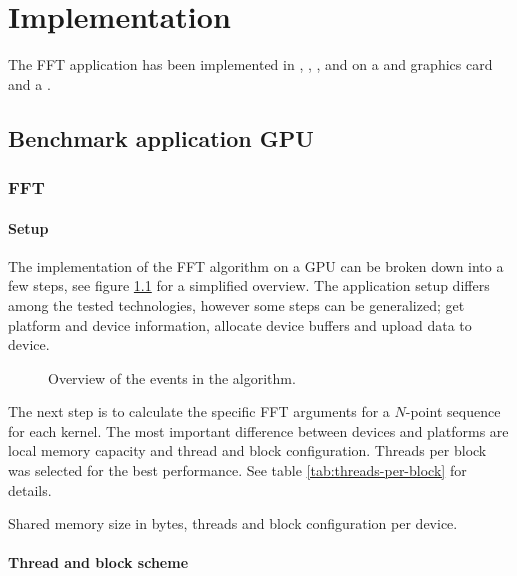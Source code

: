 \chapter{Implementation}\label{cha:implementation}

The \gls{FFT} application has been implemented in {\CPP}, {\CU}, {\OCL}, {\DX} and {\GL} on a {\NVCARD} and {\AMDCARD} graphics card and a {\INTELCPU}.

\section{Benchmark application GPU}

\subsection{FFT}

\subsubsection{Setup}

The implementation of the \gls{FFT} algorithm on a \gls{GPU} can be broken down into a few steps, see figure \ref{fig:algorithm-overview} for a simplified overview. The application setup differs among the tested technologies, however some steps can be generalized; get platform and device information, allocate device buffers and upload data to device.
\begin{figure}[H]
	\centering
	
	\caption{Overview of the events in the algorithm.}
	\label{fig:algorithm-overview}
\end{figure}

The next step is to calculate the specific \gls{FFT} arguments for a $N$-point sequence for each kernel. The most important difference between devices and platforms are local memory capacity and thread and block configuration. Threads per block was selected for the best performance. See table \ref{tab:threads-per-block} for details.
\begin{table}
	\centering
	
	\caption{Shared memory size in bytes, threads and block configuration per device.}
	\label{tab:threads-per-block}
\end{table}

\subsubsection{Thread and block scheme}

